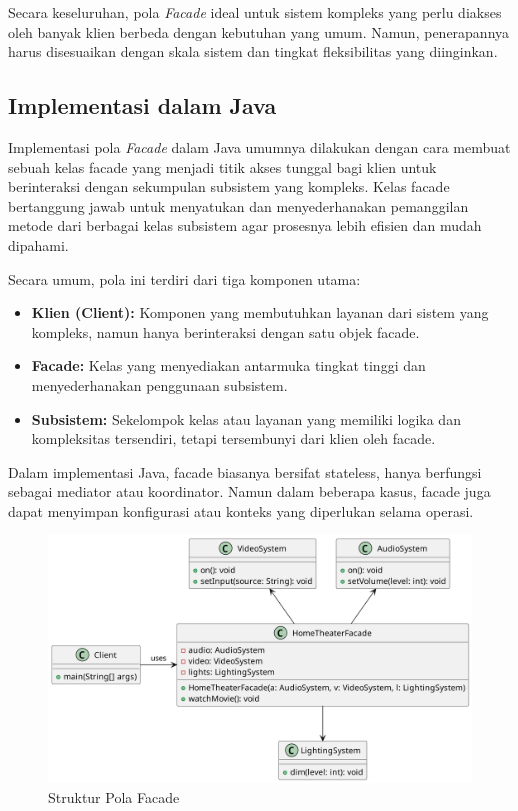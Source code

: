 Secara keseluruhan, pola \textit{Facade} ideal untuk sistem kompleks yang perlu diakses oleh banyak klien berbeda dengan kebutuhan yang umum. Namun, penerapannya harus disesuaikan dengan skala sistem dan tingkat fleksibilitas yang diinginkan.


\subsection{Implementasi dalam Java}

Implementasi pola \textit{Facade} dalam Java umumnya dilakukan dengan cara membuat sebuah kelas facade yang menjadi titik akses tunggal bagi klien untuk berinteraksi dengan sekumpulan subsistem yang kompleks. Kelas facade bertanggung jawab untuk menyatukan dan menyederhanakan pemanggilan metode dari berbagai kelas subsistem agar prosesnya lebih efisien dan mudah dipahami.

Secara umum, pola ini terdiri dari tiga komponen utama:
\begin{itemize}
	\item \textbf{Klien (Client):} Komponen yang membutuhkan layanan dari sistem yang kompleks, namun hanya berinteraksi dengan satu objek facade.
	\item \textbf{Facade:} Kelas yang menyediakan antarmuka tingkat tinggi dan menyederhanakan penggunaan subsistem.
	\item \textbf{Subsistem:} Sekelompok kelas atau layanan yang memiliki logika dan kompleksitas tersendiri, tetapi tersembunyi dari klien oleh facade.
\end{itemize}

Dalam implementasi Java, facade biasanya bersifat stateless, hanya berfungsi sebagai mediator atau koordinator. Namun dalam beberapa kasus, facade juga dapat menyimpan konfigurasi atau konteks yang diperlukan selama operasi.


\begin{figure}[h]
	\centering
	\includegraphics[width=\textwidth]{../figures/out/facade.png}
	\caption{Struktur Pola Facade}
	\label{fig:facade}
\end{figure}

